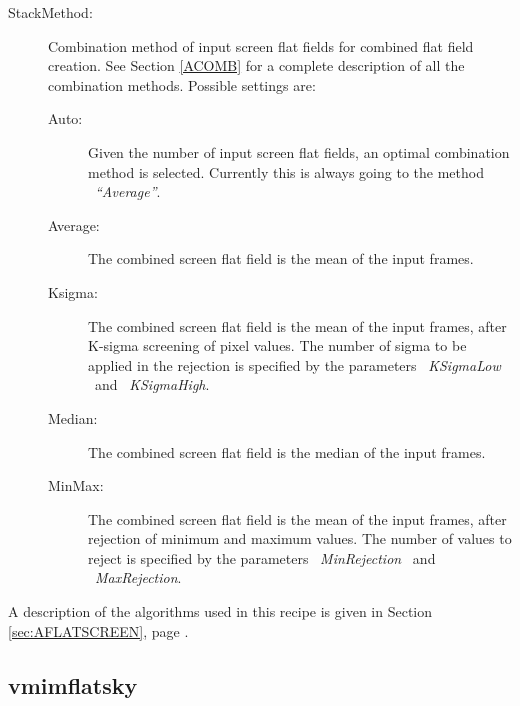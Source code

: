 \begin{description}
\begin{description}
\end{description}

\item [StackMethod:]  Combination method of input screen flat fields for 
                      combined flat field 
                      creation. See Section \ref{ACOMB} for a complete 
                      description of all the combination methods. Possible 
                      settings are:

\begin{description}

  \item [Auto:]     Given the number of input screen flat fields, an optimal 
                    combination method is selected. Currently this is
                    always going to the method \ {\it ``Average''}.

  \item [Average:]  The combined screen flat field is the mean of the 
                    input frames.

  \item [Ksigma:]   The combined screen flat field is the mean of the 
                    input frames, after
                    K-sigma screening of pixel values. The number of sigma 
                    to be applied in the rejection is specified by the 
                    parameters \ {\it KSigmaLow} \ and \ {\it KSigmaHigh}.

  \item [Median:]   The combined screen flat field is the median of the 
                    input frames.

  \item [MinMax:]   The combined screen flat field is the mean of the 
                    input frames, after
                    rejection of minimum and maximum values.
                    The number of values to reject is specified by the 
                    parameters \ {\it MinRejection} \ and \ {\it MaxRejection}.

\end{description}

\end{description}

A description of the algorithms used in this recipe is given in Section
\ref{sec:AFLATSCREEN}, page \pageref{sec:AFLATSCREEN}.

\subsection{vmimflatsky}
\label{sec:UFLATSKY}

